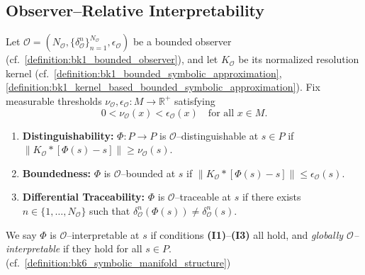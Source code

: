 \subsection*{Observer–Relative Interpretability}
\label{subsec:bk1_observer_relative_interpretability}

\begin{definition}
\label{definition:bk1_observer_relative_interpretability}

Let $\mathcal{O} = (N_{\mathcal{O}}, \{\delta^n_{\mathcal{O}}\}_{n=1}^{N_{\mathcal{O}}}, \epsilon_{\mathcal{O}})$ be a bounded observer (cf.~\ref{definition:bk1_bounded_observer}),  
and let $K_{\mathcal{O}}$ be its normalized resolution kernel (cf.~\ref{definition:bk1_bounded_symbolic_approximation}, \ref{definition:bk1_kernel_based_bounded_symbolic_approximation}).  
Fix measurable thresholds $\nu_{\mathcal{O}}, \epsilon_{\mathcal{O}} : M \to \mathbb{R}^+$ satisfying
\[
0 < \nu_{\mathcal{O}}(x) < \epsilon_{\mathcal{O}}(x) \quad \text{for all } x \in M.
\]

\begin{enumerate}[label=\textbf{(I\arabic*)}]
\item \textbf{Distinguishability:} $\Phi : P \to P$ is $\mathcal{O}$–distinguishable at $s \in P$ if  
      $\|K_{\mathcal{O}} \ast [\Phi(s) - s]\| \ge \nu_{\mathcal{O}}(s)$.

\item \textbf{Boundedness:} $\Phi$ is $\mathcal{O}$–bounded at $s$ if  
      $\|K_{\mathcal{O}} \ast [\Phi(s) - s]\| \le \epsilon_{\mathcal{O}}(s)$.

\item \textbf{Differential Traceability:} $\Phi$ is $\mathcal{O}$–traceable at $s$ if  
      there exists $n \in \{1, \ldots, N_{\mathcal{O}}\}$ such that  
      $\delta^n_{\mathcal{O}}(\Phi(s)) \ne \delta^n_{\mathcal{O}}(s)$.
\end{enumerate}

We say $\Phi$ is $\mathcal{O}$–interpretable at $s$ if conditions \textbf{(I1)}–\textbf{(I3)} all hold,  
and \emph{globally $\mathcal{O}$–interpretable} if they hold for all $s \in P$.  
(cf.~\ref{definition:bk6_symbolic_manifold_structure})

\end{definition}

\vspace{1em}

